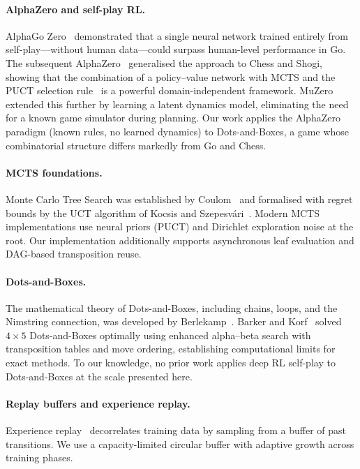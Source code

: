 \documentclass[11pt]{article}
\begin{document}
\paragraph{AlphaZero and self-play RL.}
AlphaGo Zero~\cite{silver2017mastering} demonstrated that a single neural
network trained entirely from self-play---without human data---could
surpass human-level performance in Go. The subsequent
AlphaZero~\cite{silver2018general} generalised the approach to Chess and
Shogi, showing that the combination of a policy--value network with MCTS
and the PUCT selection rule~\cite{rosin2011multi} is a powerful
domain-independent framework. MuZero~\cite{schrittwieser2020mastering}
extended this further by learning a latent dynamics model, eliminating the
need for a known game simulator during planning. Our work applies the
AlphaZero paradigm (known rules, no learned dynamics) to
Dots-and-Boxes, a game whose combinatorial structure differs markedly
from Go and Chess.

\paragraph{MCTS foundations.}
Monte Carlo Tree Search was established by Coulom~\cite{coulom2006efficient}
and formalised with regret bounds by the UCT algorithm of Kocsis and
Szepesv\'ari~\cite{kocsis2006bandit}. Modern MCTS implementations use
neural priors (PUCT) and Dirichlet exploration noise at the root.
Our implementation additionally supports asynchronous leaf evaluation
and DAG-based transposition reuse.

\paragraph{Dots-and-Boxes.}
The mathematical theory of Dots-and-Boxes, including chains, loops, and the
Nimstring connection, was developed by
Berlekamp~\cite{berlekamp2000dots}. Barker and
Korf~\cite{barker2012solving} solved $4{\times}5$ Dots-and-Boxes
optimally using enhanced alpha--beta search with transposition tables
and move ordering, establishing computational limits for exact methods.
To our knowledge, no prior work applies deep RL self-play to
Dots-and-Boxes at the scale presented here.

\paragraph{Replay buffers and experience replay.}
Experience replay~\cite{lin1992self} decorrelates training data by
sampling from a buffer of past transitions. We use a capacity-limited
circular buffer with adaptive growth across training phases.
\end{document}
